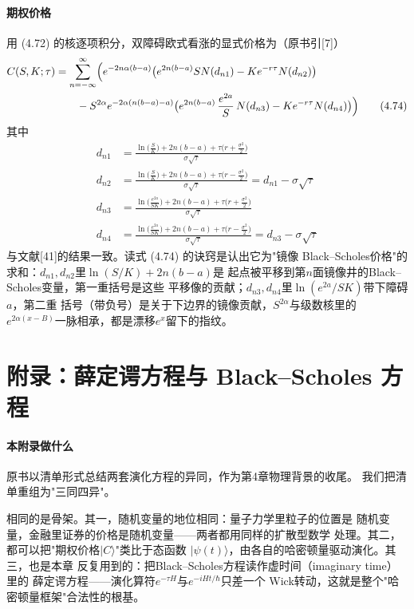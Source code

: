 \paragraph{期权价格}
用 (4.72) 的核逐项积分，双障碍欧式看涨的显式价格为（原书引[7]）
\begin{align*}
C(S,K;\tau)&=\sum_{n=-\infty}^{\infty}
\Bigl(e^{-2n\alpha(b-a)}\bigl(e^{2n(b-a)}SN(d_{n1})
-Ke^{-r\tau}N(d_{n2})\bigr)\\
&\qquad-S^{2\alpha}e^{-2\alpha(n(b-a)-a)}
\bigl(e^{2n(b-a)}\,\frac{e^{2a}}{S}\,N(d_{n3})-Ke^{-r\tau}N(d_{n4})\bigr)\Bigr)
\tag{4.74}
\end{align*}
其中
\begin{align*}
d_{n1}&=\frac{\ln\bigl(\frac{S}{K}\bigr)+2n(b-a)
+\tau\bigl(r+\frac{\sigma^{2}}{2}\bigr)}{\sigma\sqrt{\tau}}\\
d_{n2}&=\frac{\ln\bigl(\frac{S}{K}\bigr)+2n(b-a)
+\tau\bigl(r-\frac{\sigma^{2}}{2}\bigr)}{\sigma\sqrt{\tau}}
=d_{n1}-\sigma\sqrt{\tau}\\
d_{n3}&=\frac{\ln\bigl(\frac{e^{2a}}{SK}\bigr)+2n(b-a)
+\tau\bigl(r+\frac{\sigma^{2}}{2}\bigr)}{\sigma\sqrt{\tau}}\\
d_{n4}&=\frac{\ln\bigl(\frac{e^{2a}}{SK}\bigr)+2n(b-a)
+\tau\bigl(r-\frac{\sigma^{2}}{2}\bigr)}{\sigma\sqrt{\tau}}
=d_{n3}-\sigma\sqrt{\tau}
\tag{4.75}
\end{align*}
与文献[41]的结果一致。读式 (4.74) 的诀窍是认出它为"镜像
Black--Scholes价格"的求和：$d_{n1},d_{n2}$里$\ln(S/K)+2n(b-a)$是
起点被平移到第$n$面镜像井的Black--Scholes变量，第一重括号是这些
平移像的贡献；$d_{n3},d_{n4}$里$\ln(e^{2a}/SK)$带下障碍$a$，第二重
括号（带负号）是关于下边界的镜像贡献，$S^{2\alpha}$与级数核里的
$e^{2\alpha(x-B)}$一脉相承，都是漂移$e^x$留下的指纹。

\section{附录：薛定谔方程与 Black--Scholes 方程}

\paragraph{本附录做什么}
原书以清单形式总结两套演化方程的异同，作为第4章物理背景的收尾。
我们把清单重组为"三同四异"。

相同的是骨架。其一，随机变量的地位相同：量子力学里粒子的位置是
随机变量，金融里证券的价格是随机变量——两者都用同样的扩散型数学
处理。其二，都可以把"期权价格$\vert C\rangle$"类比于态函数
$\vert\psi(t)\rangle$，由各自的哈密顿量驱动演化。其三，也是本章
反复用到的：把Black--Scholes方程读作虚时间（imaginary time）里的
薛定谔方程——演化算符$e^{-\tau H}$与$e^{-iHt/\hbar}$只差一个
Wick转动，这就是整个"哈密顿量框架"合法性的根基。


